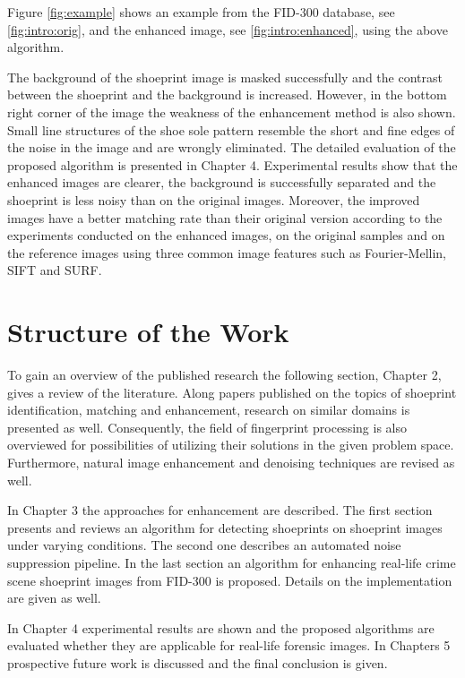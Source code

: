 \documentclass[draft,final]{vutinfth} %
\begin{document}
Figure \ref{fig:example} shows an example from the FID-300 database, see \ref{fig:intro:orig}, and the enhanced image, see \ref{fig:intro:enhanced}, using the above algorithm.
\par
The background of the shoeprint image is masked successfully and the contrast between the shoeprint and the background is increased.
However, in the bottom right corner of the image the weakness of the enhancement method is also shown.
Small line structures of the shoe sole pattern resemble the short and fine edges of the noise in the image and are wrongly eliminated.
The detailed evaluation of the proposed algorithm is presented in Chapter 4.
Experimental results show that the enhanced images are clearer, the background is successfully separated and the shoeprint is less noisy than on the original images.
Moreover, the improved images have a better matching rate than their original version according to the experiments conducted on the enhanced images, on the original samples and on the reference images using three common image features such as Fourier-Mellin, SIFT and SURF.

\section{Structure of the Work}
\par
To gain an overview of the published research the following section, Chapter 2, gives a review of the literature. 
Along papers published on the topics of shoeprint identification, matching and enhancement, research on similar domains is presented as well.
Consequently, the field of fingerprint processing is also overviewed for possibilities of utilizing their solutions in the given problem space.
Furthermore, natural image enhancement and denoising techniques are revised as well.
\par
In Chapter 3 the approaches for enhancement are described.
The first section presents and reviews an algorithm for detecting shoeprints on shoeprint images under varying conditions.
The second one describes an automated noise suppression pipeline.
In the last section an algorithm for enhancing real-life crime scene shoeprint images from FID-300 is proposed.
Details on the implementation are given as well.
\par
In Chapter 4 experimental results are shown and the proposed algorithms are evaluated whether they are applicable for real-life forensic images.
In Chapters 5 prospective future work is discussed and the final conclusion is given. 
\end{document}
